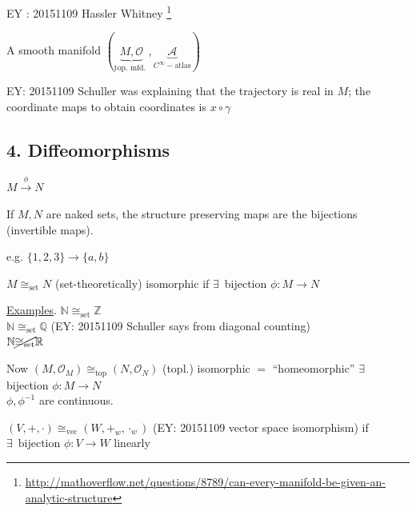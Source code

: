 EY : 20151109 Hassler Whitney \footnote{\url{http://mathoverflow.net/questions/8789/can-every-manifold-be-given-an-analytic-structure}}

\begin{definition}
A smooth manifold $(\underbrace{ M,\mathcal{O} }_{\text{top. mfd. } }, \underbrace{ \mathcal{A}}_{C^{\infty}-\text{atlas}} )$ 
\end{definition}

EY: 20151109 Schuller was explaining that the trajectory is real in $M$; the coordinate maps to obtain coordinates is $x\circ \gamma$

\subsection{4. Diffeomorphisms}

$M \xrightarrow{ \phi } N$

If $M,N$ are naked sets, the structure preserving maps are the bijections (invertible maps).  

e.g. $\lbrace 1,2,3 \rbrace \to \lbrace a,b \rbrace$

\begin{definition}
	$M \cong_{\text{set}} N$ (set-theoretically) isomorphic if $\exists \, $ bijection $\phi : M \to N$
\end{definition}

\underline{Examples}.  $\mathbb{N} \cong_{\text{set}} \mathbb{Z}$ \\
$\mathbb{N} \cong_{\text{set}} \mathbb{Q}$  (EY: 20151109 Schuller says from diagonal counting)\\
$\mathbb{N} \cancel{\cong_{\text{set}}} \mathbb{R}$

Now $(M, \mathcal{O}_M) \cong_{\text{top}} (N,\mathcal{O}_N)$ (topl.) isomorphic $=$ ``homeomorphic'' $\exists \, $ bijection $\phi : M \to N$  \\
\phantom{ \quad \quad \, } $\phi, \phi^{-1}$ are continuous.  

$(V,+,\cdot) \cong_{\text{vec}} ( W,+_w,\cdot_w)$ (EY: 20151109 vector space isomorphism) if \\
$\exists \, \text{ bijection } \phi : V \to W$ linearly

